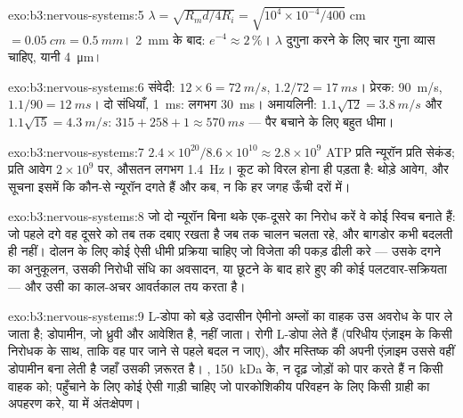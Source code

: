 \begin{solution}{exo:b3:nervous-systems:5}
$\lambda = \sqrt{R_{m}d/4R_{i}} = \sqrt{10^{4}\times 10^{-4}/400}$ cm
$= \qty{0.05}{cm} = \qty{0.5}{mm}$। \qty{2}{mm} के बाद: $e^{-4} \approx
2\,\%$। $\lambda$ दुगुना करने के लिए चार गुना व्यास चाहिए, यानी
\qty{4}{\micro m}।
\end{solution}

\begin{solution}{exo:b3:nervous-systems:6}
संवेदी: $12\times 6 = \qty{72}{m/s}$, $1.2/72 = \qty{17}{ms}$। प्रेरक:
\qty{90}{m/s}, $1.1/90 = \qty{12}{ms}$। दो संधियाँ, \qty{1}{ms}: लगभग
\qty{30}{ms}। अमायलिनी: $1.1\sqrt{12} = \qty{3.8}{m/s}$ और
$1.1\sqrt{15} = \qty{4.3}{m/s}$: $315 + 258 + 1 \approx \qty{570}{ms}$
--- पैर बचाने के लिए बहुत धीमा।
\end{solution}

\begin{solution}{exo:b3:nervous-systems:7}
$2.4\times 10^{20}/8.6\times 10^{10} \approx 2.8\times 10^{9}$ ATP प्रति
न्यूरॉन प्रति सेकंड; प्रति आवेग $2\times 10^{9}$ पर, औसतन लगभग
\qty{1.4}{Hz}। कूट को विरल होना ही पड़ता है: थोड़े आवेग, और सूचना इसमें
कि कौन-से न्यूरॉन दगते हैं और कब, न कि हर जगह ऊँची दरों में।
\end{solution}

\begin{solution}{exo:b3:nervous-systems:8}
जो दो न्यूरॉन बिना थके एक-दूसरे का निरोध करें वे कोई स्विच बनाते हैं:
जो पहले दगे वह दूसरे को तब तक दबाए रखता है जब तक चालन चलता रहे, और
बागडोर कभी बदलती ही नहीं। दोलन के लिए कोई ऐसी धीमी प्रक्रिया चाहिए जो
विजेता की पकड़ ढीली करे --- उसके दगने का अनुकूलन, उसकी निरोधी संधि का
अवसादन, या छूटने के बाद हारे हुए की कोई पलटवार-सक्रियता --- और उसी का
काल-अचर आवर्तकाल तय करता है।
\end{solution}

\begin{solution}{exo:b3:nervous-systems:9}
L-डोपा को बड़े उदासीन ऐमीनो अम्लों का वाहक उस अवरोध के पार ले जाता है;
डोपामीन, जो ध्रुवी और आवेशित है, नहीं जाता। रोगी L-डोपा लेते हैं
(परिधीय एंज़ाइम के किसी निरोधक के साथ, ताकि वह पार जाने से पहले बदल न
जाए), और मस्तिष्क की अपनी एंज़ाइम उससे वहीं डोपामीन बना लेती है जहाँ
उसकी ज़रूरत है। , \qty{150}{kDa} के, न दृढ़ जोड़ों को पार
करते हैं न किसी वाहक को; पहुँचाने के लिए कोई ऐसी गाड़ी चाहिए जो
पारकोशिकीय परिवहन के लिए किसी ग्राही का अपहरण करे, या
 में अंतःक्षेपण।
\end{solution}

